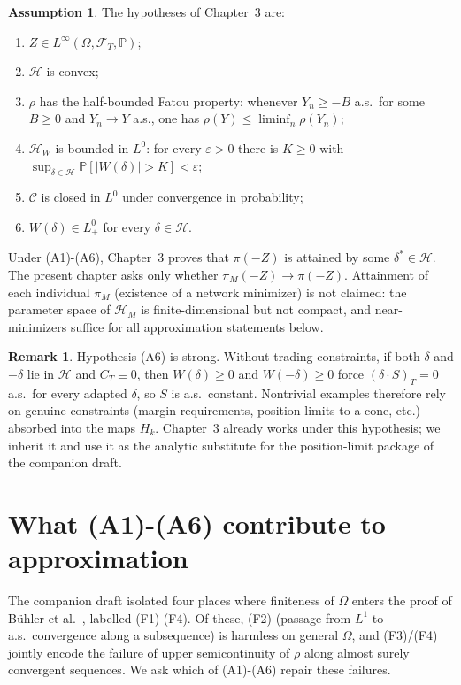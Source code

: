 \documentclass[11pt,a4paper]{report}
\numberwithin{equation}{chapter}
\theoremstyle{plain}
\theoremstyle{definition}
\newtheorem{assumption}[proposition]{Assumption}
\newtheorem{remark}[proposition]{Remark}
\newcommand{\PP}{\mathbb{P}}
\newcommand{\F}{\mathcal{F}}
\newcommand{\HH}{\mathcal{H}}
\newcommand{\CC}{\mathcal{C}}
\begin{document}
\begin{assumption}\label{ass:A}
    The hypotheses of Chapter~3 are:
    \begin{enumerate}[leftmargin=*,label=\textup{(A\arabic*)}]
        \item $Z\in L^\infty(\Omega,\F_T,\PP)$;
        \item $\HH$ is convex;
        \item $\rho$ has the half-bounded Fatou property: whenever $Y_n\ge-B$ a.s.\ for some $B\ge0$ and $Y_n\to Y$ a.s., one has $\rho(Y)\le\liminf_n\rho(Y_n)$;
        \item $\HH_W$ is bounded in $L^0$: for every $\varepsilon>0$ there is $K\ge0$ with $\sup_{\delta\in\HH}\PP[|W(\delta)|>K]<\varepsilon$;
        \item $\CC$ is closed in $L^0$ under convergence in probability;
        \item $W(\delta)\in L^0_+$ for every $\delta\in\HH$.
    \end{enumerate}
\end{assumption}

Under (A1)-(A6), Chapter~3 proves that $\pi(-Z)$ is attained by some $\delta^*\in\HH$. The present chapter asks only whether $\pi_M(-Z)\to\pi(-Z)$. Attainment of each individual $\pi_M$ (existence of a network minimizer) is not claimed: the parameter space of $\HH_M$ is finite-dimensional but not compact, and near-minimizers suffice for all approximation statements below.

\begin{remark}\label{rem:A6-strength}
    Hypothesis (A6) is strong. Without trading constraints, if both $\delta$ and $-\delta$ lie in $\HH$ and $C_T\equiv0$, then $W(\delta)\ge0$ and $W(-\delta)\ge0$ force $(\delta\cdot S)_T=0$ a.s.\ for every adapted $\delta$, so $S$ is a.s.\ constant. Nontrivial examples therefore rely on genuine constraints (margin requirements, position limits to a cone, etc.) absorbed into the maps $H_k$. Chapter~3 already works under this hypothesis; we inherit it and use it as the analytic substitute for the position-limit package of the companion draft.
\end{remark}

\section{What (A1)-(A6) contribute to approximation}\label{sec:diagnosis-A}

The companion draft isolated four places where finiteness of $\Omega$ enters the proof of B\"uhler et al.\ \cite[Proposition~4.3]{buehler}, labelled (F1)-(F4). Of these, (F2) (passage from $L^1$ to a.s.\ convergence along a subsequence) is harmless on general $\Omega$, and (F3)/(F4) jointly encode the failure of upper semicontinuity of $\rho$ along almost surely convergent sequences. We ask which of (A1)-(A6) repair these failures.
\end{document}
